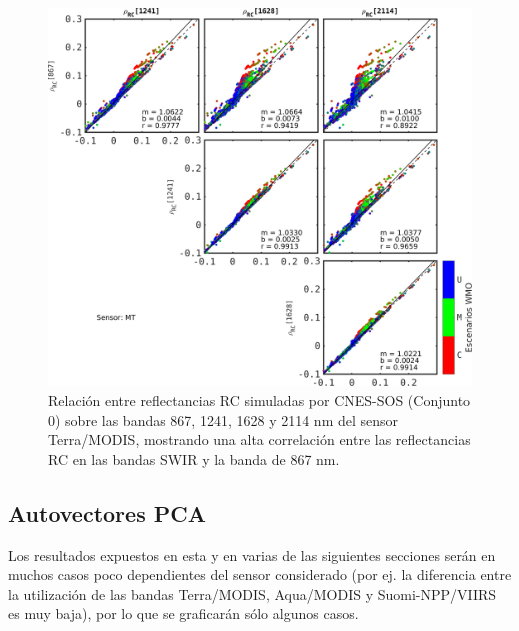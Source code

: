         \begin{figure}
        \centering
        \includegraphics[width=\textwidth]{pca/figures/rhoRCAllvsAll_MT_867.png}
        \caption[Relación entre reflectancias RC simuladas (a agua negra) sobre las bandas 867, 1241, 1628 y 2114 nm del sensor Terra/MODIS.]{Relación entre reflectancias RC simuladas por CNES-SOS (Conjunto $0$) sobre las bandas 867, 1241, 1628 y 2114 nm del sensor Terra/MODIS, mostrando una alta correlación entre las reflectancias RC en las bandas SWIR y la banda de 867 nm.}
        \label{pca:rhoRCAllvsAll_MT_867}
        \end{figure}

    \subsection{Autovectores PCA}
    \label{pca:s:results:autovectores}
        
        Los resultados expuestos en esta y en varias de las siguientes secciones serán en muchos casos poco dependientes del sensor considerado (por ej. la diferencia entre la utilización de las bandas Terra/MODIS, Aqua/MODIS y Suomi-NPP/VIIRS es muy baja), por lo que se graficarán sólo algunos casos.

